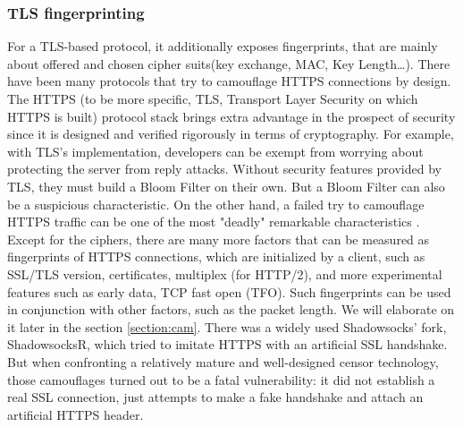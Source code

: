 \documentclass[conference]{IEEEtran}
\begin{document}
\begin{table}[h]
\centering
\caption{Average Entropy for Common Protocols}
\end{table}


\subsubsection{TLS fingerprinting}
For a TLS-based protocol, it additionally exposes fingerprints, that are mainly about offered and chosen cipher suits(key exchange, MAC, Key Length…). There have been many protocols that try to camouflage HTTPS connections by design. 
The HTTPS (to be more specific, TLS, Transport Layer Security on which HTTPS is built) protocol stack brings extra advantage in the prospect of security since it is designed and verified rigorously in terms of cryptography. For example, with TLS's implementation, developers can be exempt from worrying about protecting the server from reply attacks. Without security features provided by TLS, they must build a Bloom Filter on their own. But a Bloom Filter can also be a suspicious characteristic.
On the other hand, a failed try to camouflage HTTPS traffic can be one of the most "deadly" remarkable characteristics \cite{TLS_Fingerprinting}. Except for the ciphers, there are many more factors that can be measured as fingerprints of HTTPS connections, which are initialized by a client, such as SSL/TLS version, certificates, multiplex (for HTTP/2), and more experimental features such as early data, TCP fast open (TFO). Such fingerprints can be used in conjunction with other factors, such as the packet length. We will elaborate on it later in the section \ref{section:cam}. 
There was a widely used Shadowsocks’ fork, ShadowsocksR, which tried to imitate HTTPS with an artificial SSL handshake. But when confronting a relatively mature and well-designed censor technology, those camouflages turned out to be a fatal vulnerability: it did not establish a real SSL connection, just attempts to make a fake handshake and attach an artificial HTTPS header.
\end{document}
